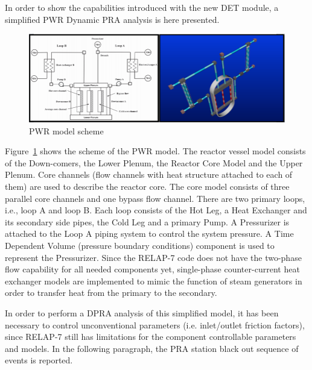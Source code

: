 \label{sec:demo}
In order to show the capabilities introduced with the new DET module, a simplified PWR Dynamic PRA analysis is here presented.
\begin{figure}[h]
   \centering
    \includegraphics[width=1.0\textwidth]{figures/PWR_TMI_SCHEME.PNG}
    \caption{PWR model scheme}
    \label{fig:PWRmodel}
\end{figure}
Figure~\ref{fig:PWRmodel} shows the scheme of the PWR model. The reactor vessel model consists of the Down-comers, the Lower Plenum, the Reactor Core Model and the Upper Plenum. Core channels (flow channels with heat structure attached to each of them) are used to describe the reactor core. The core model consists of three parallel core channels and one bypass flow channel. 
There are two primary loops, i.e., loop A and loop B. Each loop consists of the Hot Leg, a Heat Exchanger and its secondary side pipes, the Cold Leg and a primary Pump. A Pressurizer is attached to the Loop A piping system to control the system pressure. A Time Dependent Volume (pressure boundary conditions) component is used to represent the Pressurizer. Since the RELAP-7 code does not have the two-phase flow capability for all needed components yet, single-phase counter-current heat exchanger models are implemented to mimic the function of steam generators in order to transfer heat from the primary to the secondary.

In order to perform a DPRA analysis of this simplified model, it has been necessary to control unconventional parameters (i.e. inlet/outlet friction factors), since RELAP-7 still has limitations for the component controllable parameters and models. In the following paragraph, the PRA station black out sequence of events is reported. 
